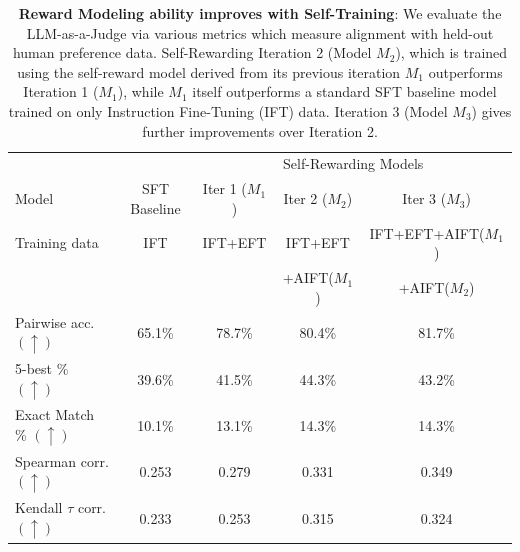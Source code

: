 \documentclass{article}
\begin{document}
\begin{table}[t]
\caption{{\bf Reward Modeling ability improves with Self-Training}:  We evaluate the LLM-as-a-Judge via various metrics which measure alignment with held-out human preference data. Self-Rewarding Iteration 2 (Model $M_2$), which is trained using the self-reward model derived from its previous iteration $M_1$ outperforms Iteration 1 ($M_1$), while $M_1$ itself outperforms a standard SFT baseline model trained on only Instruction Fine-Tuning (IFT) data. Iteration 3 (Model $M_3$) gives further improvements over Iteration 2.
}
\label{tab:reward_perf}
\vspace{2mm}
\begin{center}

\begin{tabular}{lcccc}
\toprule
                  &                    &  \multicolumn{3}{c}{Self-Rewarding Models}   \\ 
Model             &      SFT Baseline  &  Iter 1 ($M_1$) & Iter 2 ($M_2$)  & Iter 3 ($M_3$) \\
\midrule
{Training data}  &       {\footnotesize{IFT}}          &    {\footnotesize{IFT+EFT}}     &    {\footnotesize{IFT+EFT}}      &   {\footnotesize{IFT+EFT}{+AIFT($M_1$)}} \\
              &                    &               &   {\footnotesize {+AIFT($M_1$)}} &  {\footnotesize{+AIFT($M_2$)}}  \\
\midrule
Pairwise acc. $(\uparrow)$ & 65.1\% & 78.7\% & 80.4\% & 81.7\% \\
5-best \%    $(\uparrow)$ &   39.6\% & 41.5\% & 44.3\% & 43.2\% \\
Exact Match \%  $(\uparrow)$ &  10.1\% & 13.1\% & 14.3\% & 14.3\%  \\
Spearman corr. $(\uparrow)$ &  0.253 & 0.279 & 0.331 & 0.349 \\
Kendall $\tau$ corr.    $(\uparrow)$ &   0.233 & 0.253 & 0.315 & 0.324  \\
\bottomrule
\end{tabular}
\end{center}
\end{table}
\end{document}
